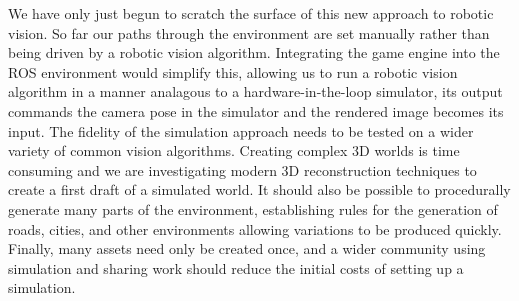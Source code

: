 \documentclass[letterpaper, 10 pt, conference]{ieeeconf}  %
\begin{document}
We have only just begun to scratch the surface of this new approach to robotic vision.
So far our paths through the environment are set manually rather than being driven by a robotic vision algorithm.
Integrating the game engine into the ROS environment would simplify this, allowing us to run a robotic vision algorithm in a manner analagous to a 
hardware-in-the-loop simulator, its output commands the camera pose in the simulator and the rendered image becomes its input.
The fidelity of the simulation approach needs to be tested on a wider variety of common vision algorithms.
Creating complex 3D worlds is time consuming and we are investigating modern 3D reconstruction techniques to create a first draft of a simulated world. It should also be possible to procedurally generate many parts of the environment, establishing rules for the generation of roads, cities, and other environments allowing variations to be produced quickly. Finally, many assets need only be created once, and a wider community using simulation and sharing work should reduce the initial costs of setting up a simulation.
\end{document}
